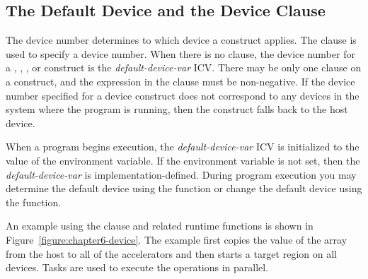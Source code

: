 \subsection{The Default Device and the Device Clause}
\label{ssec:06.device-clause}

The device number determines to which device a construct applies.  The
 clause is used to specify a device number.  When there is no
 clause, the device number for a , , ,  or  construct is the \emph{default-device-var} ICV.  There may be only one
 clause on a construct, and the expression in the clause must be
non-negative.  If the device number specified for a device construct does not
correspond to any devices in the system where the program is running, then the
construct falls back to the host device.

When a program begins execution, the \emph{default-device-var} ICV is
initialized to the value of the  environment variable.
If the environment variable is not set, then the \emph{default-device-var} is
implementation-defined.  During program execution you may determine the default
device using the  function or change the default
device using the  function.

An example using the  clause and related runtime functions is
shown in Figure~\ref{figure:chapter6-device}. The example first copies the value of the
array  from the host to all of the accelerators and then starts a
target region on all devices.  Tasks are used to
execute the operations in parallel.

